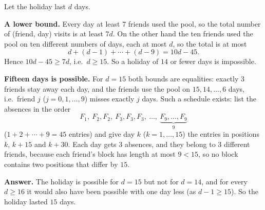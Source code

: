 Let the holiday last $d$ days.

\textbf{A lower bound.} Every day at least $7$ friends used the pool, so the total number of (friend, day) visits is at least $7d$. On the other hand the ten friends used the pool on ten different numbers of days, each at most $d$, so the total is at most
\[
d+(d-1)+\cdots+(d-9)=10d-45 .
\]
Hence $10d-45\ge7d$, i.e.\ $d\ge15$. So a holiday of $14$ or fewer days is impossible.

\textbf{Fifteen days is possible.} For $d=15$ both bounds are equalities: exactly $3$ friends stay away each day, and the friends use the pool on $15,14,\dots,6$ days, i.e.\ friend $j$ ($j=0,1,\dots,9$) misses exactly $j$ days. Such a schedule exists: list the absences in the order
\[
F_1,\ F_2,F_2,\ F_3,F_3,F_3,\ \dots,\ \underbrace{F_9,\dots,F_9}_{9}
\]
($1+2+\cdots+9=45$ entries) and give day $k$ ($k=1,\dots,15$) the entries in positions $k$, $k+15$ and $k+30$. Each day gets $3$ absences, and they belong to $3$ different friends, because each friend's block has length at most $9<15$, so no block contains two positions that differ by $15$.

\textbf{Answer.} The holiday is possible for $d=15$ but not for $d=14$, and for every $d\ge16$ it would also have been possible with one day less (as $d-1\ge15$). So the holiday lasted $\boxed{15}$ days.
